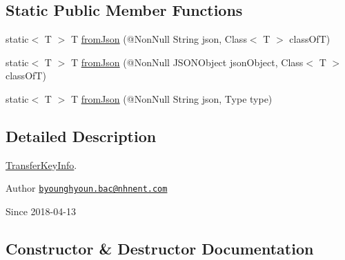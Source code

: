\subsection*{Static Public Member Functions}
\begin{DoxyCompactItemize}
\item 
static$<$ T $>$ T \hyperlink{classcom_1_1toast_1_1android_1_1gamebase_1_1base_1_1_value_object_ae6655c88c20a9a8406dc11b46250ac7b}{from\+Json} (@Non\+Null String json, Class$<$ T $>$ class\+OfT)
\item 
static$<$ T $>$ T \hyperlink{classcom_1_1toast_1_1android_1_1gamebase_1_1base_1_1_value_object_ab83c4196ee2e3f11553bbe0f04dc2101}{from\+Json} (@Non\+Null J\+S\+O\+N\+Object json\+Object, Class$<$ T $>$ class\+OfT)
\item 
static$<$ T $>$ T \hyperlink{classcom_1_1toast_1_1android_1_1gamebase_1_1base_1_1_value_object_aa901d97d495150b54bcb80c05672f58a}{from\+Json} (@Non\+Null String json, Type type)
\end{DoxyCompactItemize}


\subsection{Detailed Description}
\hyperlink{classcom_1_1toast_1_1android_1_1gamebase_1_1auth_1_1data_1_1_transfer_key_info}{Transfer\+Key\+Info}. 

\begin{DoxyAuthor}{Author}
\href{mailto:byounghyoun.bac@nhnent.com}{\tt byounghyoun.\+bac@nhnent.\+com} 
\end{DoxyAuthor}
\begin{DoxySince}{Since}
2018-\/04-\/13 
\end{DoxySince}


\subsection{Constructor \& Destructor Documentation}
\mbox{\label{classcom_1_1toast_1_1android_1_1gamebase_1_1auth_1_1data_1_1_transfer_key_info_a10eef871dc71784168523aeb72754bd2}} 
